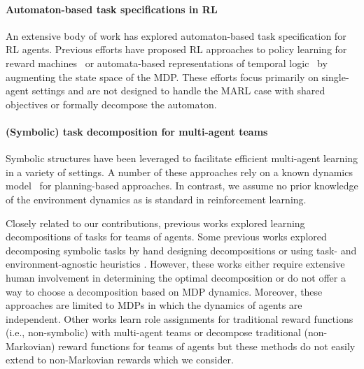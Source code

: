 \paragraph{Automaton-based task specifications in RL} 
An extensive body of work has explored automaton-based task specification for RL agents. Previous efforts have proposed RL approaches to policy learning for reward machines~\cite{icarte2022reward, Icarte2020RewardMachine, Camacho2019LTLAndBeyond} or automata-based representations of temporal logic~\cite{VoloshinLCP2022, voloshin2023eventual, hasanbeig2020deep, alur22ltlframework, sadigh2014learning, FuLTLPAC, jothimurugan2019composable, shah2024ltldeeprl} by augmenting the state space of the MDP. These efforts focus primarily on single-agent settings and are not designed to handle the MARL case with shared objectives or formally decompose the automaton.

\paragraph{(Symbolic) task decomposition for multi-agent teams}
Symbolic structures have been leveraged to facilitate efficient multi-agent learning in a variety of settings. A number of these approaches rely on a known dynamics model~\cite{karimadini2011cooperative, schillinger2016fltldecomposiiton, schillinger2018simultaneous} for planning-based approaches. In contrast, we assume no prior knowledge of the environment dynamics as is standard in reinforcement learning.

Closely related to our contributions, previous works explored learning decompositions of tasks for teams of agents. Some previous works explored decomposing symbolic tasks by hand designing decompositions or using task- and environment-agnostic heuristics \cite{neary2020reward, smith2023automatic}. However, these works either require extensive human involvement in determining the optimal decomposition or do not offer a way to choose a decomposition based on MDP dynamics. Moreover, these approaches are limited to MDPs in which the dynamics of agents are independent. Other works learn role assignments for traditional reward functions (i.e., non-symbolic) with multi-agent teams \cite{wang2020rode} or decompose traditional (non-Markovian) reward functions \cite{sun2020reinforcement} for teams of agents but these methods do not easily extend to non-Markovian rewards which we consider.

